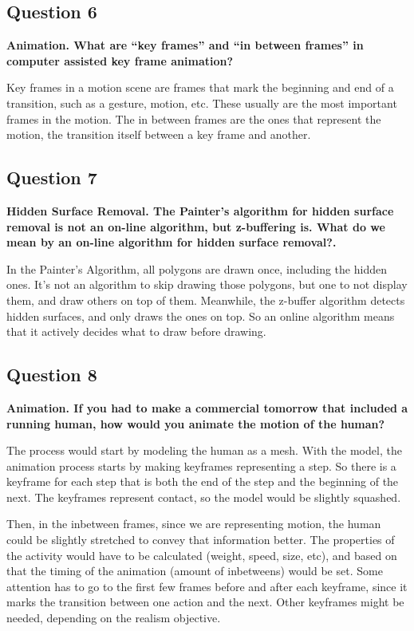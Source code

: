 \documentclass[12pt]{article}
\begin{document}
\subsection*{Question 6}
{\bfseries Animation. What are “key frames” and “in between frames” in computer assisted key frame animation?}

Key frames in a motion scene are frames that mark the beginning and end of a transition, such as a gesture, motion, etc. These usually are the most important frames in the motion. The in between frames are the ones that represent the motion, the transition itself between a key frame and another.

\subsection*{Question 7}
{\bfseries Hidden Surface Removal. The Painter’s algorithm for hidden surface removal is not an on-line algorithm, but z-buffering is. What do we mean by an on-line algorithm for hidden surface removal?.}

In the Painter's Algorithm, all polygons are drawn once, including the hidden ones. It's not an algorithm to skip drawing those polygons, but one to not display them, and draw others on top of them. Meanwhile, the z-buffer algorithm detects hidden surfaces, and only draws the ones on top. So an online algorithm means that it actively decides what to draw before drawing.

\subsection*{Question 8}
{\bfseries Animation. If you had to make a commercial tomorrow that included a running human, how would you animate the motion of the human?}

The process would start by modeling the human as a mesh. With the model, the animation process starts by making keyframes representing a step. So there is a keyframe for each step that is both the end of the step and the beginning of the next. The keyframes represent contact, so the model would be slightly squashed.

Then, in the inbetween frames, since we are representing motion, the human could be slightly stretched to convey that information better. The properties of the activity would have to be calculated (weight, speed, size, etc), and based on that the timing of the animation (amount of inbetweens) would be set. Some attention has to go to the first few frames before and after each keyframe, since it marks the transition between one action and the next. Other keyframes might be needed, depending on the realism objective.
\end{document}
